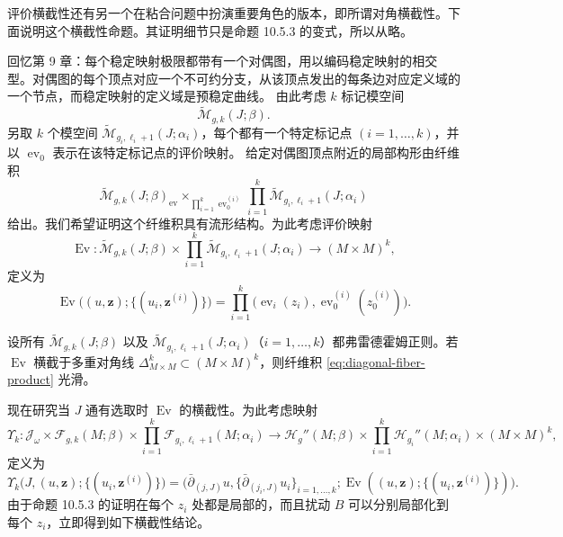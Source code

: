 评价横截性还有另一个在粘合问题中扮演重要角色的版本，即所谓对角横截性。下面说明这个横截性命题。其证明细节只是命题 10.5.3 的变式，所以从略。

回忆第 9 章：每个稳定映射极限都带有一个对偶图，用以编码稳定映射的相交型。对偶图的每个顶点对应一个不可约分支，从该顶点发出的每条边对应定义域的一个节点，而稳定映射的定义域是预稳定曲线。
由此考虑 $k$ 标记模空间
\[
 \widetilde{\mathcal M}_{g,k}(J;\beta).
\]
另取 $k$ 个模空间
$\widetilde{\mathcal M}_{g_i,\ell_i+1}(J;\alpha_i)$，每个都有一个特定标记点
$(i=1,\ldots,k)$，并以 $\operatorname{ev}_0$ 表示在该特定标记点的评价映射。
给定对偶图顶点附近的局部构形由纤维积
\begin{equation}
 \widetilde{\mathcal M}_{g,k}(J;\beta)_{\operatorname{ev}}
 \mathop{\times}_{\prod_{i=1}^k\operatorname{ev}_0^{(i)}}
 \prod_{i=1}^k\widetilde{\mathcal M}_{g_i,\ell_i+1}(J;\alpha_i)
 \label{eq:diagonal-fiber-product}
\end{equation}
给出。我们希望证明这个纤维积具有流形结构。为此考虑评价映射
\[
 \operatorname{Ev}:\widetilde{\mathcal M}_{g,k}(J;\beta)
 \times\prod_{i=1}^k\widetilde{\mathcal M}_{g_i,\ell_i+1}(J;\alpha_i)
 \longrightarrow(M\times M)^k,
\]
定义为
\begin{equation}
 \operatorname{Ev}\bigl((u,\boldsymbol z);
 \{(u_i,\boldsymbol z^{(i)})\}\bigr)
 =\prod_{i=1}^k
 \bigl(\operatorname{ev}_i(z_i),
 \operatorname{ev}_0^{(i)}(z_0^{(i)})\bigr).
 \label{eq:multi-evaluation-map}
\end{equation}

\begin{corollary}\label{cor:diagonal-fiber-product-smooth}
设所有
$\widetilde{\mathcal M}_{g,k}(J;\beta)$ 以及
$\widetilde{\mathcal M}_{g_i,\ell_i+1}(J;\alpha_i)$（$i=1,\ldots,k$）都弗雷德霍姆正则。若
$\operatorname{Ev}$ 横截于多重对角线
$\Delta_{M\times M}^k\subset(M\times M)^k$，则纤维积
\eqref{eq:diagonal-fiber-product} 光滑。
\end{corollary}

现在研究当 $J$ 通有选取时 $\operatorname{Ev}$ 的横截性。为此考虑映射
\[
 \Upsilon_k:\mathcal J_\omega\times\mathcal F_{g,k}(M;\beta)
 \times\prod_{i=1}^k\mathcal F_{g_i,\ell_i+1}(M;\alpha_i)
 \longrightarrow
 \mathcal H_g''(M;\beta)\times
 \prod_{i=1}^k\mathcal H_{g_i}''(M;\alpha_i)\times(M\times M)^k,
\]
定义为
\begin{equation}
 \Upsilon_k\bigl(J,(u,\boldsymbol z);
 \{(u_i,\boldsymbol z^{(i)})\}\bigr)
 =\bigl(\bar\partial_{(j,J)}u,
 \{\bar\partial_{(j_i,J)}u_i\}_{i=1,\ldots,k};
 \operatorname{Ev}((u,\boldsymbol z);
 \{(u_i,\boldsymbol z^{(i)})\})\bigr).
 \label{eq:universal-multi-evaluation-map}
\end{equation}
由于命题 10.5.3 的证明在每个 $z_i$ 处都是局部的，而且扰动 $B$ 可以分别局部化到每个 $z_i$，立即得到如下横截性结论。

